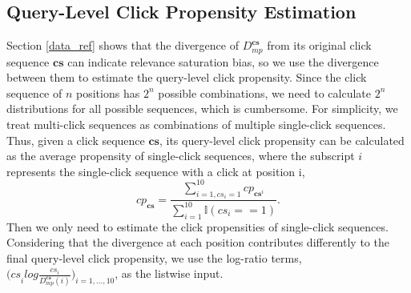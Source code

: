 \subsection{Query-Level Click Propensity Estimation}
Section \ref{data_ref} shows that the divergence of $D_{mp}^{\mathbf{cs}}$ from its original click sequence $\mathbf{cs}$ can indicate relevance saturation bias, so we use the divergence between them to estimate the query-level click propensity. Since the click sequence of $n$ positions has $2^n$ possible combinations, we need to calculate $2^n$ distributions for all possible sequences, which is cumbersome. For simplicity, we treat multi-click sequences as combinations of multiple single-click sequences. Thus, given a click sequence $\mathbf{cs}$, its query-level click propensity can be calculated as the average propensity of single-click sequences, where the subscript $i$ represents the single-click sequence with a click at position i,
\begin{equation}
cp_{\mathbf{cs}}=\frac{\sum_{i=1,cs_i=1}^{10}cp_{\mathbf{cs}^i}}{\sum_{i=1}^{10}\mathbb{I}(cs_i==1)}\text{.}
\end{equation}
Then we only need to estimate the click propensities of single-click sequences. 
Considering that the divergence at each position contributes differently to the final query-level click propensity, we use the log-ratio terms, ${(cs}_ilog\frac{{cs}_i}{D_{mp}^{\mathbf{cs}}(i)})_{i=1,\dots,10}$, as the listwise input. 
